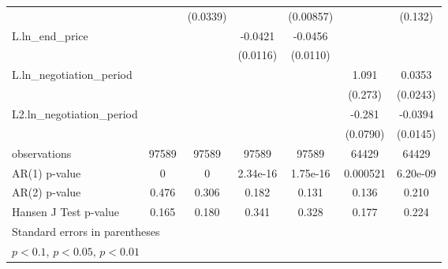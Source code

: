 {\begin{tabular}{l*{6}{c}}
            &                     &    (0.0339)         &                     &   (0.00857)         &                     &     (0.132)         \\
\addlinespace
L.ln\_end\_price&                     &                     &     -0.0421\sym{***}&     -0.0456\sym{***}&                     &                     \\
            &                     &                     &    (0.0116)         &    (0.0110)         &                     &                     \\
\addlinespace
L.ln\_negotiation\_period&                     &                     &                     &                     &       1.091\sym{***}&      0.0353         \\
            &                     &                     &                     &                     &     (0.273)         &    (0.0243)         \\
\addlinespace
L2.ln\_negotiation\_period&                     &                     &                     &                     &      -0.281\sym{***}&     -0.0394\sym{***}\\
            &                     &                     &                     &                     &    (0.0790)         &    (0.0145)         \\
\midrule
observations&       97589         &       97589         &       97589         &       97589         &       64429         &       64429         \\
AR(1) p-value&           0         &           0         &    2.34e-16         &    1.75e-16         &    0.000521         &    6.20e-09         \\
AR(2) p-value&       0.476         &       0.306         &       0.182         &       0.131         &       0.136         &       0.210         \\
Hansen J Test p-value&       0.165         &       0.180         &       0.341         &       0.328         &       0.177         &       0.224         \\
\bottomrule
\multicolumn{7}{l}{\footnotesize Standard errors in parentheses}\\
\multicolumn{7}{l}{\footnotesize \sym{*} \(p<0.1\), \sym{**} \(p<0.05\), \sym{***} \(p<0.01\)}\\
\end{tabular}
}
